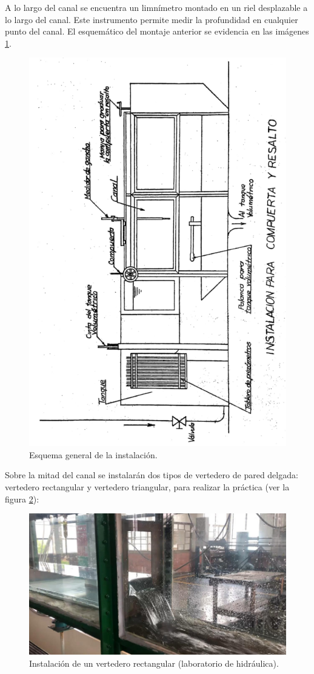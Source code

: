 \documentclass[10pt, a4paper]{exam}
\begin{document}

A lo largo del canal se encuentra un limnímetro montado en un riel desplazable a lo largo del canal. Este instrumento permite  medir  la profundidad en cualquier punto del canal. El esquemático del montaje anterior se evidencia en las imágenes \ref{fig:esqpdf}.

\begin{figure}[h]
    \centering
    \includegraphics[angle=270,width=0.6\linewidth]{Images/esquema.png}
    \caption{Esquema general de la instalación.}
    \label{fig:esqpdf}
\end{figure}

Sobre la mitad del canal se instalarán dos tipos de vertedero de pared delgada: vertedero rectangular y vertedero triangular, para realizar la práctica (ver la figura \ref{fig:verte}):

\begin{figure}[h]
    \centering
    \includegraphics[width=0.7\linewidth]{Images/vertedero.png}
    \caption{Instalación de un vertedero rectangular (laboratorio de hidráulica).}
    \label{fig:verte}
\end{figure}
\end{document}
